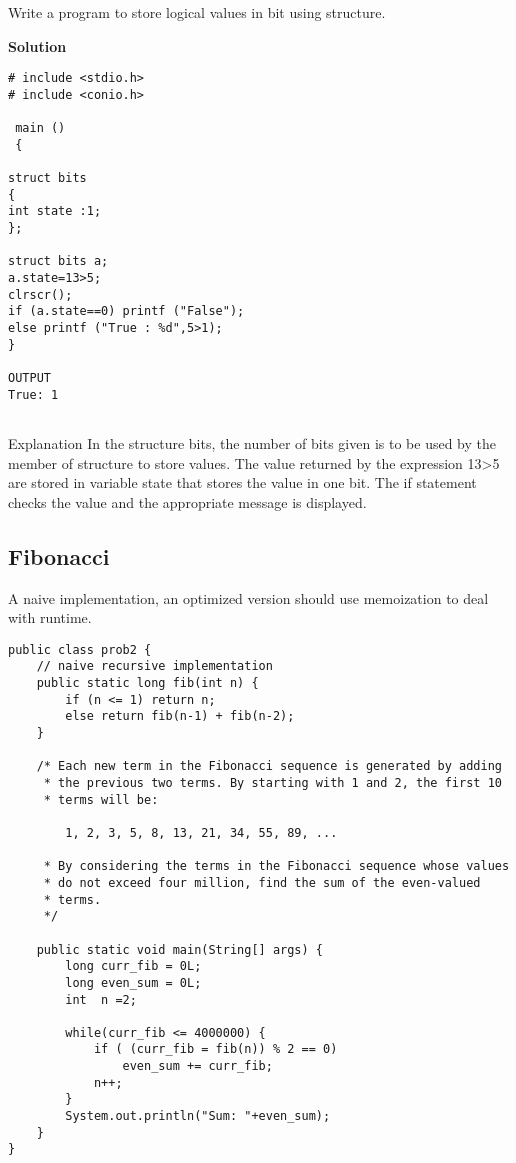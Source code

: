 \documentclass[letterpaper]{article}
\begin{document}
Write a program to store logical values in bit using structure.

\textbf{Solution}
\begin{verbatim}
# include <stdio.h>
# include <conio.h>

 main ()
 {

struct bits
{
int state :1;
};

struct bits a;
a.state=13>5;
clrscr();
if (a.state==0) printf ("False");
else printf ("True : %d",5>1);
}

OUTPUT
True: 1


\end{verbatim}

Explanation In the structure bits, the number of bits given is to be used by the member of structure to store values. The value returned by the expression 13>5 are stored in variable state that stores the value in one bit. The if statement checks the value and the appropriate message is displayed.

\subsection{Fibonacci}
A naive implementation, an optimized version should use memoization to deal with runtime.

\begin{lstlisting}
public class prob2 {
	// naive recursive implementation
	public static long fib(int n) {
        if (n <= 1) return n;
        else return fib(n-1) + fib(n-2);
    }
	
	/* Each new term in the Fibonacci sequence is generated by adding 
	 * the previous two terms. By starting with 1 and 2, the first 10 
	 * terms will be:

		1, 2, 3, 5, 8, 13, 21, 34, 55, 89, ...

	 * By considering the terms in the Fibonacci sequence whose values 
	 * do not exceed four million, find the sum of the even-valued 
	 * terms.
	 */

	public static void main(String[] args) {
		long curr_fib = 0L;
		long even_sum = 0L;
		int  n =2;
		
		while(curr_fib <= 4000000) {
			if ( (curr_fib = fib(n)) % 2 == 0)
				even_sum += curr_fib;
			n++;
		}
		System.out.println("Sum: "+even_sum);
	}
}
\end{lstlisting}
%  
\end{document}
